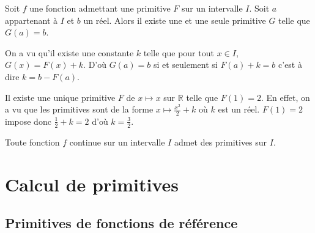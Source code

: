 \documentclass[french]{book}
\begin{document}
\begin{prop}
 Soit $f$ une fonction admettant une primitive $F$ sur un intervalle $I$. Soit $a$ appartenant à $I$ et $b$ un réel. Alors il existe une et une seule primitive $G$ telle que $G(a)=b$.
\end{prop}

\begin{demo}
On a vu qu'il existe une constante $k$ telle que pour tout $x\in I$, $G(x)=F(x)+k$. D'où $G(a)=b$ si et seulement si $F(a)+k=b$ c'est à dire $k=b-F(a)$.
\end{demo}


\begin{exemple}
 Il existe une unique primitive $F$ de $x\mapsto x$ sur $\mathbb{R}$ telle que $F(1)=2$. En effet, on a vu que les primitives sont de la forme $x\mapsto \frac{x^2}{2}+k$ où $k$ est un réel. $F(1)=2$ impose donc $\frac{1}{2}+k=2$ d'où $k=\frac{3}{2}$.
\end{exemple}


\begin{thm}
 Toute fonction $f$ continue sur un intervalle $I$ admet des primitives sur $I$.
\end{thm}

\section{Calcul de primitives}

\subsection{Primitives de fonctions de référence}
\end{document}
